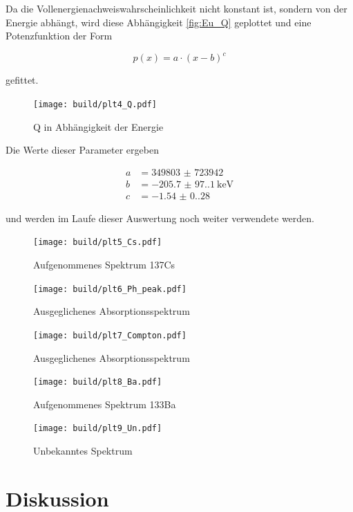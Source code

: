 Da die Vollenergienachweiswahrscheinlichkeit nicht konstant ist, sondern von der Energie abhängt, wird diese Abhängigkeit \eqref{fig:Eu_Q} geplottet 
und eine Potenzfunktion der Form

\begin{equation}
	p(x)=a \cdot (x-b)^c
\end{equation}

gefittet. 

\begin{figure}[H]
    \centering
    \texttt{[image: build/plt4\_Q.pdf]}
	\caption{Q in Abhängigkeit der Energie}
	\label{fig:Eu_Q}
\end{figure}

Die  Werte dieser Parameter ergeben

\begin{align*}
	a&=\num{349803(723942)}\\
	b&=\qty{-205.7(97.1)}{\kilo\eV}\\
	c&=\num{-1.54(0.28)}
\end{align*}

und werden im Laufe dieser Auswertung noch weiter verwendete werden. 


\begin{figure}
    \centering
    \texttt{[image: build/plt5\_Cs.pdf]}
	\caption{Aufgenommenes Spektrum 137Cs}
	\label{fig:Cs_spektrum}
\end{figure}

\begin{figure}
    \centering
    \texttt{[image: build/plt6\_Ph\_peak.pdf]}
	\caption{Ausgeglichenes Absorptionsspektrum}
	\label{fig:Cs_peak}
\end{figure}

\begin{figure}
    \centering
    \texttt{[image: build/plt7\_Compton.pdf]}
	\caption{Ausgeglichenes Absorptionsspektrum}
	\label{fig:Compton}
\end{figure}

\begin{figure}
    \centering
    \texttt{[image: build/plt8\_Ba.pdf]}
	\caption{Aufgenommenes Spektrum 133Ba}
	\label{fig:Ba_spektrum}
\end{figure}

\begin{figure}
    \centering
    \texttt{[image: build/plt9\_Un.pdf]}
	\caption{Unbekanntes Spektrum}
	\label{fig:Un_spektrum}
\end{figure}




\section{Diskussion}

\newpage
\printbibliography

